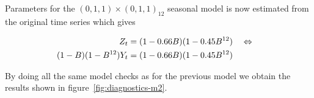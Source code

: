 Parameters for the $(0,1,1)\times(0,1,1)_{12}$ seasonal model is now estimated
from the original time series which gives 

\begin{align}
    Z_t &= (1-0.66B)(1-0.45B^{12}) \quad\Leftrightarrow\quad\label{eq:m2}\\
    (1-B)(1-B^{12})Y_t &= (1-0.66B)(1-0.45B^{12})\nonumber
\end{align}

By doing all the same model checks as for the previous model we obtain the
results shown in figure~\ref{fig:diagnostics-m2}. \par

\begin{figure}
    \centering
    \mbox{%
         \quad 
    }
    \mbox{%
         \quad 
}
\end{figure}

